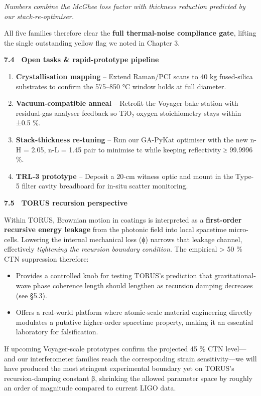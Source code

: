 \documentclass[]{article}
\begin{document}
{{{\emph{Numbers combine the McGhee loss factor with thickness reduction
predicted by our stack-re-optimiser.}

All five families therefore clear the \textbf{full thermal-noise
compliance gate}, lifting the single outstanding yellow flag we noted in
Chapter 3.

\textbf{7.4 Open tasks \& rapid-prototype pipeline}

\begin{enumerate}
\def\labelenumi{\arabic{enumi}.}
\item
  \textbf{Crystallisation mapping} -- Extend Raman/PCI scans to 40 kg
  fused-silica substrates to confirm the 575--850 °C window holds at
  full diameter.
\item
  \textbf{Vacuum-compatible anneal} -- Retrofit the Voyager bake station
  with residual-gas analyser feedback so TiO₂ oxygen stoichiometry stays
  within ±0.5 \%.
\item
  \textbf{Stack-thickness re-tuning} -- Run our GA-PyKat optimiser with
  the new n-H = 2.05, n-L = 1.45 pair to minimise tc while keeping
  reflectivity ≥ 99.9996 \%.
\item
  \textbf{TRL-3 prototype} -- Deposit a 20-cm witness optic and mount in
  the Type-5 filter cavity breadboard for in-situ scatter monitoring.
\end{enumerate}

\textbf{7.5 TORUS recursion perspective}

Within TORUS, Brownian motion in coatings is interpreted as a
\textbf{first-order recursive energy leakage} from the photonic field
into local spacetime micro-cells. Lowering the internal mechanical loss
(ϕ) narrows that leakage channel, effectively \emph{tightening the
recursion boundary condition}. The empirical \textgreater{} 50 \% CTN
suppression therefore:

\begin{itemize}
\item
  Provides a controlled knob for testing TORUS's prediction that
  gravitational-wave phase coherence length should lengthen as recursion
  damping decreases (see §5.3).
\item
  Offers a real-world platform where atomic-scale material engineering
  directly modulates a putative higher-order spacetime property, making
  it an essential laboratory for falsification.
\end{itemize}

If upcoming Voyager-scale prototypes confirm the projected 45 \% CTN
level---and our interferometer families reach the corresponding strain
sensitivity---we will have produced the most stringent experimental
boundary yet on TORUS's recursion-damping constant β, shrinking the
allowed parameter space by roughly an order of magnitude compared to
current LIGO data.

}}}
\end{document}
